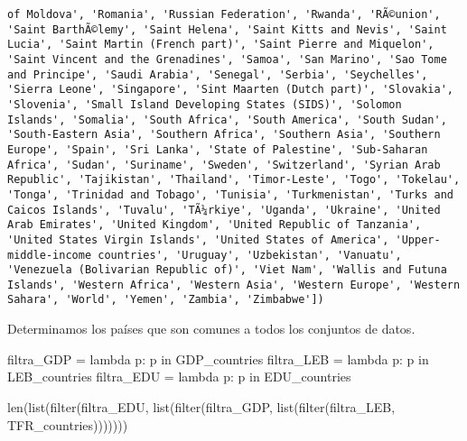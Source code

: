 \documentclass[
  letterpaper,
  DIV=11,
  numbers=noendperiod]{scrreprt}
\newenvironment{Shaded}{\begin{snugshade}}{\end{snugshade}}
\newcommand{\BuiltInTok}[1]{\textcolor[rgb]{0.00,0.23,0.31}{#1}}
\newcommand{\KeywordTok}[1]{\textcolor[rgb]{0.00,0.23,0.31}{#1}}
\newcommand{\NormalTok}[1]{\textcolor[rgb]{0.00,0.23,0.31}{#1}}
\newcommand{\OperatorTok}[1]{\textcolor[rgb]{0.37,0.37,0.37}{#1}}
\begin{document}
\begin{verbatim}
of Moldova', 'Romania', 'Russian Federation', 'Rwanda', 'RÃ©union', 'Saint BarthÃ©lemy', 'Saint Helena', 'Saint Kitts and Nevis', 'Saint Lucia', 'Saint Martin (French part)', 'Saint Pierre and Miquelon', 'Saint Vincent and the Grenadines', 'Samoa', 'San Marino', 'Sao Tome and Principe', 'Saudi Arabia', 'Senegal', 'Serbia', 'Seychelles', 'Sierra Leone', 'Singapore', 'Sint Maarten (Dutch part)', 'Slovakia', 'Slovenia', 'Small Island Developing States (SIDS)', 'Solomon Islands', 'Somalia', 'South Africa', 'South America', 'South Sudan', 'South-Eastern Asia', 'Southern Africa', 'Southern Asia', 'Southern Europe', 'Spain', 'Sri Lanka', 'State of Palestine', 'Sub-Saharan Africa', 'Sudan', 'Suriname', 'Sweden', 'Switzerland', 'Syrian Arab Republic', 'Tajikistan', 'Thailand', 'Timor-Leste', 'Togo', 'Tokelau', 'Tonga', 'Trinidad and Tobago', 'Tunisia', 'Turkmenistan', 'Turks and Caicos Islands', 'Tuvalu', 'TÃ¼rkiye', 'Uganda', 'Ukraine', 'United Arab Emirates', 'United Kingdom', 'United Republic of Tanzania', 'United States Virgin Islands', 'United States of America', 'Upper-middle-income countries', 'Uruguay', 'Uzbekistan', 'Vanuatu', 'Venezuela (Bolivarian Republic of)', 'Viet Nam', 'Wallis and Futuna Islands', 'Western Africa', 'Western Asia', 'Western Europe', 'Western Sahara', 'World', 'Yemen', 'Zambia', 'Zimbabwe'])
\end{verbatim}

Determinamos los países que son comunes a todos los conjuntos de datos.

\begin{Shaded}
\begin{Highlighting}[]
\NormalTok{filtra\_GDP }\OperatorTok{=} \KeywordTok{lambda}\NormalTok{ p: p }\KeywordTok{in}\NormalTok{ GDP\_countries}
\NormalTok{filtra\_LEB }\OperatorTok{=} \KeywordTok{lambda}\NormalTok{ p: p }\KeywordTok{in}\NormalTok{ LEB\_countries}
\NormalTok{filtra\_EDU }\OperatorTok{=} \KeywordTok{lambda}\NormalTok{ p: p }\KeywordTok{in}\NormalTok{ EDU\_countries}
\end{Highlighting}
\end{Shaded}

\begin{Shaded}
\begin{Highlighting}[]
\BuiltInTok{len}\NormalTok{(}\BuiltInTok{list}\NormalTok{(}\BuiltInTok{filter}\NormalTok{(filtra\_EDU, }\BuiltInTok{list}\NormalTok{(}\BuiltInTok{filter}\NormalTok{(filtra\_GDP, }\BuiltInTok{list}\NormalTok{(}\BuiltInTok{filter}\NormalTok{(filtra\_LEB, TFR\_countries)))))))}
\end{Highlighting}
\end{Shaded}
\end{document}
